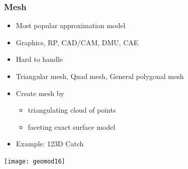 \begin{frame}[fragile]\frametitle{Mesh}
\begin{itemize}
\item Most popular approximation model
\item Graphics, RP, CAD/CAM, DMU, CAE
\item Hard to handle
\item Triangular mesh, Quad mesh, General polygonal mesh
\item Create mesh by
\begin{itemize}
\item triangulating cloud of points
\item faceting exact surface model
\end{itemize}
\item Example: 123D Catch
\end{itemize}

			\begin{center}
	\texttt{[image: geomod16]}
			\end{center}
\end{frame}


